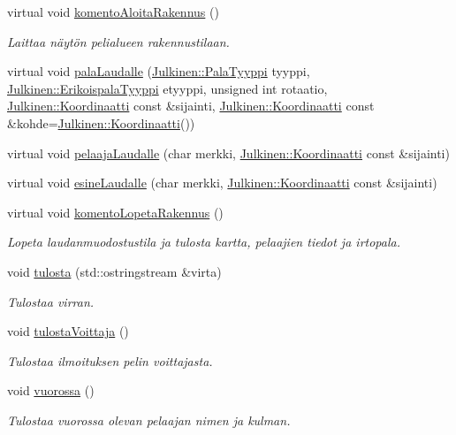 \begin{DoxyCompactItemize}
virtual void \hyperlink{class_naytto_a01a422be1ca30135634914767c8cd633}{komento\+Aloita\+Rakennus} ()
\begin{DoxyCompactList}\small\item\em Laittaa näytön pelialueen rakennustilaan. \end{DoxyCompactList}\item 
virtual void \hyperlink{class_naytto_adc11e0eddc17bfe1b9aa6971969b8549}{pala\+Laudalle} (\hyperlink{namespace_julkinen_a272c70e0503191a485c8a9cd4281e6f5}{Julkinen\+::\+Pala\+Tyyppi} tyyppi, \hyperlink{namespace_julkinen_afc26052e09d0b2214f749492cc5fff19}{Julkinen\+::\+Erikoispala\+Tyyppi} etyyppi, unsigned int rotaatio, \hyperlink{class_julkinen_1_1_koordinaatti}{Julkinen\+::\+Koordinaatti} const \&sijainti, \hyperlink{class_julkinen_1_1_koordinaatti}{Julkinen\+::\+Koordinaatti} const \&kohde=\hyperlink{class_julkinen_1_1_koordinaatti}{Julkinen\+::\+Koordinaatti}())
\item 
virtual void \hyperlink{class_naytto_a2425a87d92478b0c86ffe698985b6c86}{pelaaja\+Laudalle} (char merkki, \hyperlink{class_julkinen_1_1_koordinaatti}{Julkinen\+::\+Koordinaatti} const \&sijainti)
\item 
virtual void \hyperlink{class_naytto_a54c6a0f6fff0facbf4e769d77e80b341}{esine\+Laudalle} (char merkki, \hyperlink{class_julkinen_1_1_koordinaatti}{Julkinen\+::\+Koordinaatti} const \&sijainti)
\item 
virtual void \hyperlink{class_naytto_aa3faa1f5dde0249c90530f0fdfb25d7b}{komento\+Lopeta\+Rakennus} ()
\begin{DoxyCompactList}\small\item\em Lopeta laudanmuodostustila ja tulosta kartta, pelaajien tiedot ja irtopala. \end{DoxyCompactList}\item 
void \hyperlink{class_naytto_aeed4659324edc4f043ff43b2042de759}{tulosta} (std\+::ostringstream \&virta)
\begin{DoxyCompactList}\small\item\em Tulostaa virran. \end{DoxyCompactList}\item 
\hypertarget{class_naytto_a546211154c2e5fbfe30b3f329c3cdabe}{}void \hyperlink{class_naytto_a546211154c2e5fbfe30b3f329c3cdabe}{tulosta\+Voittaja} ()\label{class_naytto_a546211154c2e5fbfe30b3f329c3cdabe}

\begin{DoxyCompactList}\small\item\em Tulostaa ilmoituksen pelin voittajasta. \end{DoxyCompactList}\item 
void \hyperlink{class_naytto_a606d18d37a41a1dd32e7e837ce45d6ca}{vuorossa} ()
\begin{DoxyCompactList}\small\item\em Tulostaa vuorossa olevan pelaajan nimen ja kulman. \end{DoxyCompactList}\end{DoxyCompactItemize}


